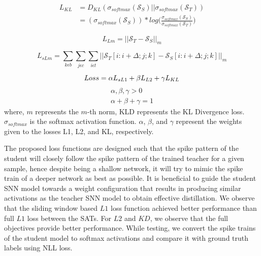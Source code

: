 \documentclass{article}
\begin{document}
\begin{equation}
\begin{split}
L_{KL} & =  D_{KL}( \sigma_{softmax}(\mathcal{S}_{S}) || \sigma_{softmax}(\mathcal{S}_{T})) \\
 & = (\sigma_{softmax}(\mathcal{S}_{S}))*log\Big(\frac{\sigma_{softmax}(\mathcal{S}_{S})}{\sigma_{softmax}(\mathcal{S}_{T})}\Big)
 \label{eq:fullLossCalulationKL}
\end{split}
\end{equation}

\begin{equation}
L_{Lm} = ||\mathcal{S}_{T} - \mathcal{S}_{S}||_{m}
\label{eq:fullLossCalulation}
\end{equation}

\begin{equation}
L_{sLm} = \sum_{k \epsilon b} \sum_{j \epsilon c} \sum_{i \epsilon t} ||\mathcal{S}_{T}[i:i+\Delta;j;k] - \mathcal{S}_{S}[i:i+\Delta;j;k]||_{m}
\label{eq:slidingLossCalulation}
\end{equation}

\begin{equation}
Loss =  \alpha L_{sL1} + \beta L_{L2} + \gamma L_{KL}
\vspace{-10pt}
\end{equation}
\begin{eqnarray*}
\alpha , \beta , \gamma > 0 \\
\alpha + \beta + \gamma = 1
\end{eqnarray*}
where, $m$ represents the $m$-th norm, KLD represents the KL Divergence loss.
$\sigma_{softmax}$ is the softmax activation function. $\alpha$, $\beta$, and $\gamma$ represent the weights given to the losses L1, L2, and KL, respectively.

The proposed loss functions are designed such that the spike pattern of the student will closely follow the spike pattern of the trained teacher for a given sample, hence despite being a shallow network, it will try to mimic the spike train of a deeper network as best as possible. It is beneficial to guide the student SNN model towards a weight configuration that results in producing similar activations as the teacher SNN model to obtain effective distillation. We observe that the sliding window based $L1$ loss function achieved better performance than full $L1$ loss between the SATs. For $L2$ and $KD$, we observe that the full objectives provide better performance. While testing, we convert the spike trains of the student model to softmax activations and compare it with ground truth labels using NLL loss. 
\end{document}
